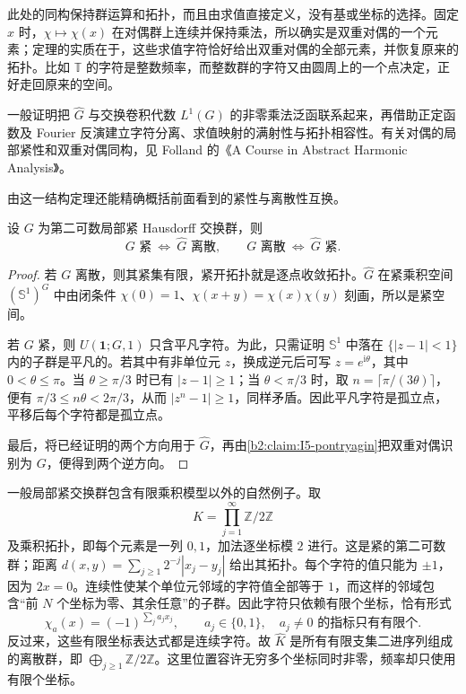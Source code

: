 此处的同构保持群运算和拓扑，而且由求值直接定义，没有基或坐标的选择。固定 \(x\) 时，\(\chi\mapsto\chi(x)\) 在对偶群上连续并保持乘法，所以确实是双重对偶的一个元素；定理的实质在于，这些求值字符恰好给出双重对偶的全部元素，并恢复原来的拓扑。比如 \(\mathbb T\) 的字符是整数频率，而整数群的字符又由圆周上的一个点决定，正好走回原来的空间。

一般证明把 \(\widehat G\) 与交换卷积代数 \(L^1(G)\) 的非零乘法泛函联系起来，再借助正定函数及 Fourier 反演建立字符分离、求值映射的满射性与拓扑相容性。有关对偶的局部紧性和双重对偶同构，见 Folland 的《A Course in Abstract Harmonic Analysis》\cite[Sections 4.1 and 4.3]{Folland2016Abstract}。

由这一结构定理还能精确概括前面看到的紧性与离散性互换。

\begin{corollary}[紧群与离散群的互换]
\label{b2:cor:I5-compact-discrete}
设 \(G\) 为第二可数局部紧 Hausdorff 交换群，则
\[
 G\text{ 紧}\ \Longleftrightarrow\ \widehat G\text{ 离散},\qquad
 G\text{ 离散}\ \Longleftrightarrow\ \widehat G\text{ 紧}.
\]
\end{corollary}
\begin{proof}
若 \(G\) 离散，则其紧集有限，紧开拓扑就是逐点收敛拓扑。\(\widehat G\) 在紧乘积空间 \((\mathbb S^1)^G\) 中由闭条件
\(\chi(0)=1\)、\(\chi(x+y)=\chi(x)\chi(y)\) 刻画，所以是紧空间。

若 \(G\) 紧，则 \(U(\mathbf1;G,1)\) 只含平凡字符。为此，只需证明 \(\mathbb S^1\) 中落在 \(\{|z-1|<1\}\) 内的子群是平凡的。若其中有非单位元 \(z\)，换成逆元后可写 \(z=e^{\mathrm i\theta}\)，其中 \(0<\theta\le\pi\)。当 \(\theta\ge\pi/3\) 时已有 \(|z-1|\ge1\)；当 \(\theta<\pi/3\) 时，取 \(n=\lceil\pi/(3\theta)\rceil\)，便有 \(\pi/3\le n\theta<2\pi/3\)，从而 \(|z^n-1|\ge1\)，同样矛盾。因此平凡字符是孤立点，平移后每个字符都是孤立点。

最后，将已经证明的两个方向用于 \(\widehat G\)，再由\cref{b2:claim:I5-pontryagin}把双重对偶识别为 \(G\)，便得到两个逆方向。
\end{proof}

一般局部紧交换群包含有限乘积模型以外的自然例子。取
\[
 K=\prod_{j=1}^{\infty}\mathbb Z/2\mathbb Z
\]
及乘积拓扑，即每个元素是一列 \(0,1\)，加法逐坐标模 \(2\) 进行。这是紧的第二可数群；距离
\(d(x,y)=\sum_{j\ge1}2^{-j}|x_j-y_j|\) 给出其拓扑。每个字符的值只能为 \(\pm1\)，因为 \(2x=0\)。连续性使某个单位元邻域的字符值全部等于 \(1\)，而这样的邻域包含“前 \(N\) 个坐标为零、其余任意”的子群。因此字符只依赖有限个坐标，恰有形式
\[
 \chi_a(x)=(-1)^{\sum_j a_jx_j},\qquad
 a_j\in\{0,1\},\quad a_j\ne0\text{ 的指标只有有限个}.
\]
反过来，这些有限坐标表达式都是连续字符。故 \(\widehat K\) 是所有有限支集二进序列组成的离散群，即 \(\bigoplus_{j\ge1}\mathbb Z/2\mathbb Z\)。这里位置容许无穷多个坐标同时非零，频率却只使用有限个坐标。

